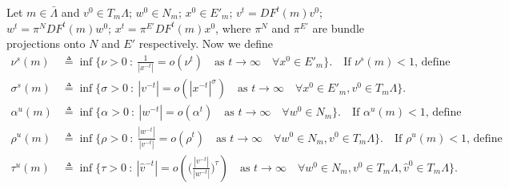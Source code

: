 \documentclass[usletter,11pt]{article}
\theoremstyle{remark}
\begin{document}
Let $m\in \bar{\Lambda}$ and $v^0 \in T_m \Lambda$; $w^0\in N_m$; $x^0\in E'_m$; $v^t = DF^t(m)v^0$; $w^t = \pi^N DF^t(m)w^0$; $x^t = \pi^{E'}DF^t(m)x^0$,
where $\pi^N$ and $\pi^{E'}$ are bundle projections onto $N$ and $E'$ respectively. Now we define
\begin{align*}
 \nu^s(m) &\triangleq \inf \Big\{\nu>0 \: : \: \frac{1}{|x^{-t}|} = o(\nu^t) \quad \text{as $t \rightarrow \infty$} \quad \forall x^0\in E'_m\Big\}. \quad \text{If $\nu^s(m)<1$, define}\\
 \sigma^s(m) &\triangleq \inf \Big\{\sigma>0 \: : \: |v^{-t}| = o(|x^{-t}|^\sigma) \quad \text{as $t \rightarrow \infty$} \quad \forall x^0\in E'_m, v^0\in T_m\Lambda\Big\}.\\
 \alpha^u(m) &\triangleq \inf \Big\{\alpha>0 \: : \: |w^{-t}| = o(\alpha^t) \quad \text{as $t \rightarrow \infty$}\quad \forall w^0\in N_m\Big\}. \quad \text{If $\alpha^u(m)<1$, define}\\
 \rho^u(m) &\triangleq \inf \Big\{\rho>0 \: : \: \frac{|w^{-t}|}{|v^{-t}|} = o(\rho^t) \quad \text{as $t \rightarrow \infty$} \quad \forall w^0\in N_m, v^0\in T_m\Lambda\Big\}.\quad \text{If $\rho^u(m)<1$, define}\\
 \tau^u(m) &\triangleq \inf \Big\{\tau>0 \: : \: |\hat{v}^{-t}| = o\left(\Big(\frac{|v^{-t}|}{|w^{-t}|}\Big)^{\tau}\right) \quad \text{as $t \rightarrow \infty$} \quad \forall w^0\in N_m, v^0\in T_m\Lambda,\hat{v}^0\in T_m\Lambda\Big\}.
\end{align*}
\end{document}
